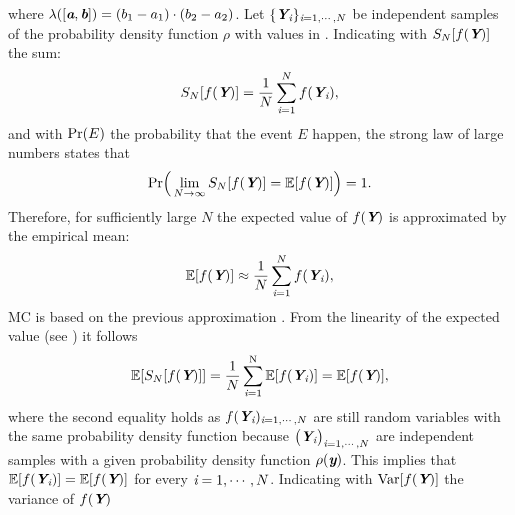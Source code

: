 where $\lambda([\textit{\textbf{a}},\textit{\textbf{b}}]) = (b_1-a_1)\cdot(b_2-a_2)$.
Let $\{\textit{\textbf{Y}}_{\textit{i}}\}_{\textit{i} = 1, \cdots, N}$ be independent samples of the probability density function $\rho$ with values in .
Indicating with $S_{N}[f(\textit{\textbf{Y}})]$ the sum: 
\begin{equation}
S_{N}[f(\textit{\textbf{Y}})] = \frac{1}{N} \sum_{\textit{i}=1}^{N} f(\textit{\textbf{Y}}_{\textit{i}}),
\end{equation}
and with $\textrm{Pr}(E)$ the probability that the event $E$ happen,
the strong law of large numbers states that
\begin{equation}
\textrm{Pr}\Big(\lim_{N\rightarrow\infty}S_{N}[f(\textit{\textbf{Y}})] = \mathbb{E}[f(\textit{\textbf{Y}})] \Big) = 1.
\end{equation}
Therefore, for sufficiently large $N$ the expected value of $f(\textit{\textbf{Y}})$ is approximated by the empirical mean:
\begin{equation}\label{eq:approx_MC_QMC}
\mathbb{E}[f(\textit{\textbf{Y}})] \approx \frac{1}{N} \sum_{\textit{i}=1}^{N} f(\textit{\textbf{Y}}_{\textit{i}}),
\end{equation}
MC is based on the previous approximation \cite{owen2003quasi}. From the linearity of the expected value (see \cite{grinstead2012introduction})
 it follows
\begin{equation}\label{eq:linearity}
\mathbb{E}[S_{N}[f(\textit{\textbf{Y}})]] = \frac{1}{N}\sum_{\textit{i}=1}^{\textrm{N}}\mathbb{E}[f(\textit{\textbf{Y}}_{\textit{i}})] = \mathbb{E}[f(\textit{\textbf{Y}})],
\end{equation}
where the second equality holds as
$f(\textit{\textbf{Y}}_{\textit{i}})_{\textit{i}=1, \cdots, N}$ are still random variables with the same probability density function because $\big(\textit{\textbf{Y}}_{\textit{i}}\big)_{\textit{i}=1, \cdots, N}$ are independent samples 
with a given probability density function $\rho(\textit{\textbf{y}})$. This implies that $\mathbb{E}[f(\textit{\textbf{Y}}_{\textit{i}})] = \mathbb{E}[f(\textit{\textbf{Y}})]$ for every $\textit{i}=1, \cdots, N$. Indicating with $\textrm{Var}[f(\textit{\textbf{Y}})]$ the variance of $f(\textit{\textbf{Y}})$
